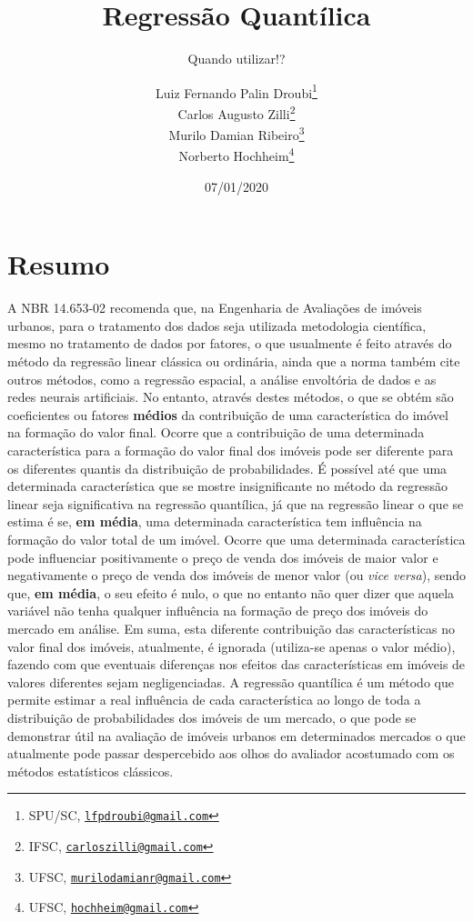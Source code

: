 \documentclass[a4paper, 12pt]{article}
\title{Regressão Quantílica}
\subtitle{Quando utilizar!?}
\author{Luiz Fernando Palin Droubi\footnote{SPU/SC,
  \href{mailto:lfpdroubi@gmail.com}{\nolinkurl{lfpdroubi@gmail.com}}} \\ Carlos Augusto Zilli\footnote{IFSC,
  \href{mailto:carloszilli@gmail.com}{\nolinkurl{carloszilli@gmail.com}}} \\ Murilo Damian Ribeiro\footnote{UFSC,
  \href{mailto:murilodamianr@gmail.com}{\nolinkurl{murilodamianr@gmail.com}}
} \\ Norberto Hochheim\footnote{UFSC,
  \href{mailto:hochheim@gmail.com}{\nolinkurl{hochheim@gmail.com}}}}
\date{07/01/2020}
\begin{document}
\maketitle

\hypertarget{resumo}{%
\section*{Resumo}\label{resumo}}

A NBR 14.653-02 \autocite{NBR1465302} recomenda que, na Engenharia de
Avaliações de imóveis urbanos, para o tratamento dos dados seja
utilizada metodologia científica, mesmo no tratamento de dados por
fatores, o que usualmente é feito através do método da regressão linear
clássica ou ordinária, ainda que a norma também cite outros métodos,
como a regressão espacial, a análise envoltória de dados e as redes
neurais artificiais. No entanto, através destes métodos, o que se obtém
são coeficientes ou fatores \textbf{médios} da contribuição de uma
característica do imóvel na formação do valor final. Ocorre que a
contribuição de uma determinada característica para a formação do valor
final dos imóveis pode ser diferente para os diferentes quantis da
distribuição de probabilidades. É possível até que uma determinada
característica que se mostre insignificante no método da regressão
linear seja significativa na regressão quantílica, já que na regressão
linear o que se estima é se, \textbf{em média}, uma determinada
característica tem influência na formação do valor total de um imóvel.
Ocorre que uma determinada característica pode influenciar positivamente
o preço de venda dos imóveis de maior valor e negativamente o preço de
venda dos imóveis de menor valor (ou \emph{vice versa}), sendo que,
\textbf{em média}, o seu efeito é nulo, o que no entanto não quer dizer
que aquela variável não tenha qualquer influência na formação de preço
dos imóveis do mercado em análise. Em suma, esta diferente contribuição
das características no valor final dos imóveis, atualmente, é ignorada
(utiliza-se apenas o valor médio), fazendo com que eventuais diferenças
nos efeitos das características em imóveis de valores diferentes sejam
negligenciadas. A regressão quantílica é um método que permite estimar a
real influência de cada característica ao longo de toda a distribuição
de probabilidades dos imóveis de um mercado, o que pode se demonstrar
útil na avaliação de imóveis urbanos em determinados mercados o que
atualmente pode passar despercebido aos olhos do avaliador acostumado
com os métodos estatísticos clássicos.
\end{document}
